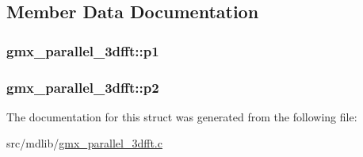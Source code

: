 \subsection{\-Member \-Data \-Documentation}
\hypertarget{structgmx__parallel__3dfft_a55ffd6eba20a99e454a94fcf575d2fa8}{
\subsubsection[{p1}]{ {\bf gmx\-\_\-parallel\-\_\-3dfft\-::p1}}}\label{structgmx__parallel__3dfft_a55ffd6eba20a99e454a94fcf575d2fa8}
\hypertarget{structgmx__parallel__3dfft_ae9f3f1db84b59c7d396e461f78cd6699}{
\subsubsection[{p2}]{ {\bf gmx\-\_\-parallel\-\_\-3dfft\-::p2}}}\label{structgmx__parallel__3dfft_ae9f3f1db84b59c7d396e461f78cd6699}


\-The documentation for this struct was generated from the following file\-:\begin{DoxyCompactItemize}
\item 
src/mdlib/\hyperlink{gmx__parallel__3dfft_8c}{gmx\-\_\-parallel\-\_\-3dfft.\-c}\end{DoxyCompactItemize}
